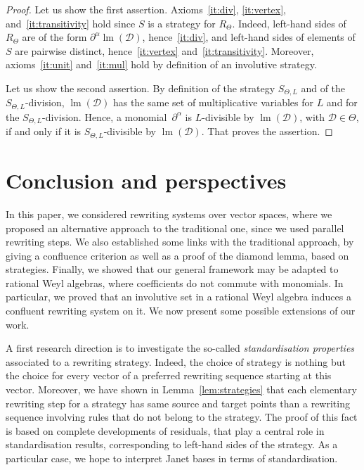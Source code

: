 \documentclass[11pt]{article}
\theoremstyle{definition}
\newcommand\D{\mathcal{D}}
\DeclareMathOperator{\lm}{lm}
\newcommand\RTheta{R_{\Theta}}
\newcommand\SThetaL{S_{\Theta,L}}
\begin{document}
\begin{proof}
  Let us show the first assertion. Axioms~\ref{it:div}, \ref{it:vertex},
  and~\ref{it:transitivity} hold since $S$ is a strategy for $\RTheta$.
  Indeed, left-hand sides of $\RTheta$ are of the form
  $\partial^\alpha\lm(\D)$, hence~\ref{it:div}, and left-hand sides of
  elements of $S$ are pairwise distinct, hence~\ref{it:vertex}
  and~\ref{it:transitivity}. Moreover, axioms~\ref{it:unit}
  and~\ref{it:mul} hold by definition of an involutive strategy.

  Let us show the second assertion. By definition of the strategy
  $\SThetaL$ and of the $\SThetaL$-division, $\lm(\D)$ has the same set
  of multiplicative variables for $L$ and for the $\SThetaL$-division.
  Hence, a monomial~$\partial^\alpha$ is $L$-divisible by $\lm(\D)$, with
  $\D\in\Theta$, if and only if it is $\SThetaL$-divisible by $\lm(\D)$.
  That proves the assertion.
\end{proof}

\section{Conclusion and perspectives}

In this paper, we considered rewriting systems over vector spaces, where
we proposed an alternative approach to the traditional one, since we used
parallel rewriting steps. We also established some links with the
traditional approach, by giving a confluence criterion as well as a proof
of the diamond lemma, based on strategies. Finally, we showed that our
general framework may be adapted to rational Weyl algebras, where
coefficients do not commute with monomials. In particular, we proved that
an involutive set in a rational Weyl algebra induces a confluent
rewriting system on it. We now present some possible extensions of our
work.
\medskip

A first research direction is to investigate the so-called
{\em standardisation properties}~\cite{Mellies05jwklop} associated to a
rewriting strategy. Indeed, the choice of strategy is nothing but the
choice for every vector of a preferred rewriting sequence starting at 
this vector. Moreover, we have shown in Lemma~\ref{lem:strategies} that
each elementary rewriting step for a strategy has same source and target
points than a rewriting sequence involving rules that do not belong to
the strategy. The proof of this fact is based on complete developments of
residuals, that play a central role in standardisation results,
corresponding to left-hand sides of the strategy. As a particular case,
we hope to interpret Janet bases in terms of standardisation.
\medskip
\end{document}

